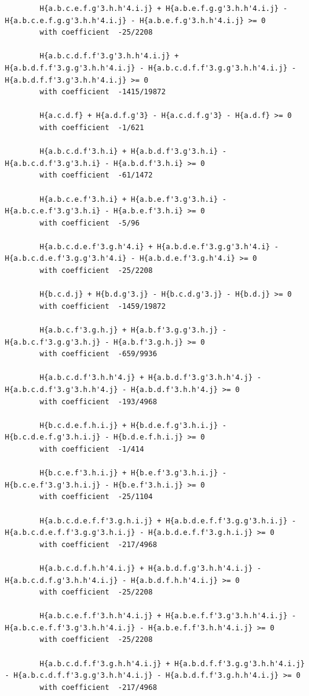 \documentclass[11pt, a4paper]{kybernetika}
\begin{document}
\begin{verbatim}
		H{a.b.c.e.f.g'3.h.h'4.i.j} + H{a.b.e.f.g.g'3.h.h'4.i.j} - H{a.b.c.e.f.g.g'3.h.h'4.i.j} - H{a.b.e.f.g'3.h.h'4.i.j} >= 0
		with coefficient  -25/2208
		
		H{a.b.c.d.f.f'3.g'3.h.h'4.i.j} + H{a.b.d.f.f'3.g.g'3.h.h'4.i.j} - H{a.b.c.d.f.f'3.g.g'3.h.h'4.i.j} - H{a.b.d.f.f'3.g'3.h.h'4.i.j} >= 0
		with coefficient  -1415/19872
		
		H{a.c.d.f} + H{a.d.f.g'3} - H{a.c.d.f.g'3} - H{a.d.f} >= 0
		with coefficient  -1/621
		
		H{a.b.c.d.f'3.h.i} + H{a.b.d.f'3.g'3.h.i} - H{a.b.c.d.f'3.g'3.h.i} - H{a.b.d.f'3.h.i} >= 0
		with coefficient  -61/1472
		
		H{a.b.c.e.f'3.h.i} + H{a.b.e.f'3.g'3.h.i} - H{a.b.c.e.f'3.g'3.h.i} - H{a.b.e.f'3.h.i} >= 0
		with coefficient  -5/96
		
		H{a.b.c.d.e.f'3.g.h'4.i} + H{a.b.d.e.f'3.g.g'3.h'4.i} - H{a.b.c.d.e.f'3.g.g'3.h'4.i} - H{a.b.d.e.f'3.g.h'4.i} >= 0
		with coefficient  -25/2208
		
		H{b.c.d.j} + H{b.d.g'3.j} - H{b.c.d.g'3.j} - H{b.d.j} >= 0
		with coefficient  -1459/19872
		
		H{a.b.c.f'3.g.h.j} + H{a.b.f'3.g.g'3.h.j} - H{a.b.c.f'3.g.g'3.h.j} - H{a.b.f'3.g.h.j} >= 0
		with coefficient  -659/9936
		
		H{a.b.c.d.f'3.h.h'4.j} + H{a.b.d.f'3.g'3.h.h'4.j} - H{a.b.c.d.f'3.g'3.h.h'4.j} - H{a.b.d.f'3.h.h'4.j} >= 0
		with coefficient  -193/4968
		
		H{b.c.d.e.f.h.i.j} + H{b.d.e.f.g'3.h.i.j} - H{b.c.d.e.f.g'3.h.i.j} - H{b.d.e.f.h.i.j} >= 0
		with coefficient  -1/414
		
		H{b.c.e.f'3.h.i.j} + H{b.e.f'3.g'3.h.i.j} - H{b.c.e.f'3.g'3.h.i.j} - H{b.e.f'3.h.i.j} >= 0
		with coefficient  -25/1104
		
		H{a.b.c.d.e.f.f'3.g.h.i.j} + H{a.b.d.e.f.f'3.g.g'3.h.i.j} - H{a.b.c.d.e.f.f'3.g.g'3.h.i.j} - H{a.b.d.e.f.f'3.g.h.i.j} >= 0
		with coefficient  -217/4968
		
		H{a.b.c.d.f.h.h'4.i.j} + H{a.b.d.f.g'3.h.h'4.i.j} - H{a.b.c.d.f.g'3.h.h'4.i.j} - H{a.b.d.f.h.h'4.i.j} >= 0
		with coefficient  -25/2208
		
		H{a.b.c.e.f.f'3.h.h'4.i.j} + H{a.b.e.f.f'3.g'3.h.h'4.i.j} - H{a.b.c.e.f.f'3.g'3.h.h'4.i.j} - H{a.b.e.f.f'3.h.h'4.i.j} >= 0
		with coefficient  -25/2208
		
		H{a.b.c.d.f.f'3.g.h.h'4.i.j} + H{a.b.d.f.f'3.g.g'3.h.h'4.i.j} - H{a.b.c.d.f.f'3.g.g'3.h.h'4.i.j} - H{a.b.d.f.f'3.g.h.h'4.i.j} >= 0
		with coefficient  -217/4968
		

\end{verbatim}
\end{document}
